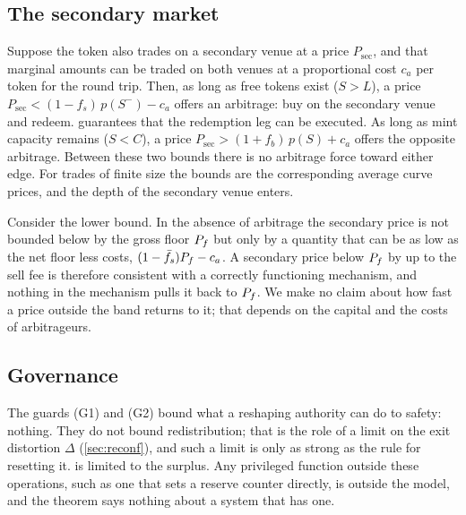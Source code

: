 \subsection{The secondary market}\label{sec:secondary}

Suppose the token also trades on a secondary venue at a price $P_{\mathrm{sec}}$, and that marginal amounts can be traded on both venues at a proportional cost $c_a$ per token for the round trip. Then, as long as free tokens exist ($S>L$), a price $P_{\mathrm{sec}}<(1-f_s)\,p(S^-)-c_a$ offers an arbitrage: buy on the secondary venue and redeem.  guarantees that the redemption leg can be executed. As long as mint capacity remains ($S<C$), a price $P_{\mathrm{sec}}>(1+f_b)\,p(S)+c_a$ offers the opposite arbitrage. Between these two bounds there is no arbitrage force toward either edge. For trades of finite size the bounds are the corresponding average curve prices, and the depth of the secondary venue enters.

Consider the lower bound. In the absence of arbitrage the secondary price is not bounded below by the gross floor $P_f$ but only by a quantity that can be as low as the net floor less costs, $(1-\bar f_s)P_f-c_a$. A secondary price below $P_f$ by up to the sell fee is therefore consistent with a correctly functioning mechanism, and nothing in the mechanism pulls it back to $P_f$. We make no claim about how fast a price outside the band returns to it; that depends on the capital and the costs of arbitrageurs.

\subsection{Governance}

The guards (G1) and (G2) bound what a reshaping authority can do to safety: nothing. They do not bound redistribution; that is the role of a limit on the exit distortion $\Delta$ (\cref{sec:reconf}), and such a limit is only as strong as the rule for resetting it.  is limited to the surplus. Any privileged function outside these operations, such as one that sets a reserve counter directly, is outside the model, and the theorem says nothing about a system that has one.
